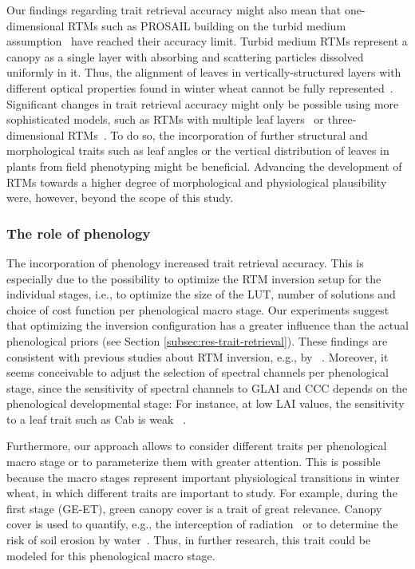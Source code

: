 Our findings regarding trait retrieval accuracy might also mean that one-dimensional RTMs such as PROSAIL building on the turbid medium assumption~\citep{verhoef_light_1984} have reached their accuracy limit. Turbid medium RTMs represent a canopy as a single layer with absorbing and scattering particles dissolved uniformly in it. Thus, the alignment of leaves in vertically-structured layers with different optical properties found in winter wheat cannot be fully represented~\citep{zhao_effect_2017}. Significant changes in trait retrieval accuracy might only be possible using more sophisticated models, such as RTMs with multiple leaf layers~\citep{verhoef_coupled_2007} or three-dimensional RTMs~\citep{jiang_effective_2022}. To do so, the incorporation of further structural and morphological traits such as leaf angles or the vertical distribution of leaves in plants from field phenotyping might be beneficial. Advancing the development of RTMs towards a higher degree of morphological and physiological plausibility were, however, beyond the scope of this study.

\subsubsection{The role of phenology}

The incorporation of phenology increased trait retrieval accuracy. This is especially due to the possibility to optimize the RTM inversion setup for the individual stages, i.e., to optimize the size of the LUT, number of solutions and choice of cost function per phenological macro stage. Our experiments suggest that optimizing the inversion configuration has a greater influence than the actual phenological priors (see Section \ref{subsec:res-trait-retrieval}). These findings are consistent with previous studies about RTM inversion, e.g., by ~\cite{verrelst_optimizing_2014}. Moreover, it seems conceivable to adjust the selection of spectral channels per phenological stage, since the sensitivity of spectral channels to GLAI and CCC depends on the phenological developmental stage: For instance, at low LAI values, the sensitivity to a leaf trait such as Cab is weak ~\citep{verhoef_hyperspectral_2018}.

Furthermore, our approach allows to consider different traits per phenological macro stage or to parameterize them with greater attention. This is possible because the macro stages represent important physiological transitions in winter wheat, in which different traits are important to study. For example, during the first stage (GE-ET), green canopy cover is a trait of great relevance. Canopy cover is used to quantify, e.g., the interception of radiation~\citep{steven_foliage_1986} or to determine the risk of soil erosion by water~\citep{gabriels_assessment_2003}. Thus, in further research, this trait could be modeled for this phenological macro stage.

